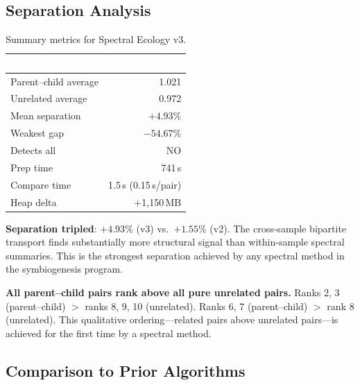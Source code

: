 \documentclass{../yalumba}
\begin{document}
\subsection{Separation Analysis}

\begin{table}[H]
  \centering
  \tablestyle
  \caption{Summary metrics for Spectral Ecology v3.}
  \label{tab:summary}
  \begin{tabular}{lr}
    \toprule
    \rowcolor{table-header}
    \textcolor{white}{\textbf{Metric}} &
    \textcolor{white}{\textbf{Value}} \\
    \midrule
    Parent--child average & 1.021 \\
    Unrelated average & 0.972 \\
    Mean separation & $+4.93\%$ \\
    Weakest gap & $-54.67\%$ \\
    Detects all & NO \\
    Prep time & 741\,s \\
    Compare time & 1.5\,s (0.15\,s/pair) \\
    Heap delta & $+$1{,}150\,MB \\
    \bottomrule
  \end{tabular}
\end{table}

\begin{keyfinding}
\textbf{Separation tripled}: $+4.93\%$ (v3) vs.\ $+1.55\%$ (v2).  The
cross-sample bipartite transport finds substantially more structural signal
than within-sample spectral summaries.  This is the strongest separation
achieved by any spectral method in the symbiogenesis program.
\end{keyfinding}

\begin{keyfinding}
\textbf{All parent--child pairs rank above all pure unrelated pairs.}
Ranks 2, 3 (parent--child) $>$ ranks 8, 9, 10 (unrelated).  Ranks 6, 7
(parent--child) $>$ rank 8 (unrelated).  This qualitative ordering---related
pairs above unrelated pairs---is achieved for the first time by a spectral
method.
\end{keyfinding}

\subsection{Comparison to Prior Algorithms}
\end{document}
